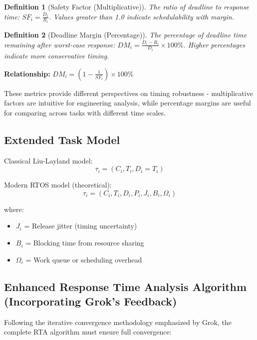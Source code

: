 \documentclass[12pt,a4paper]{article}
\newtheorem{definition}{Definition}
\begin{document}
\begin{definition}[Safety Factor (Multiplicative)]
The ratio of deadline to response time: $SF_i = \frac{D_i}{R_i}$. Values greater than 1.0 indicate schedulability with margin.
\end{definition}

\begin{definition}[Deadline Margin (Percentage)]
The percentage of deadline time remaining after worst-case response: $DM_i = \frac{D_i - R_i}{D_i} \times 100\%$. Higher percentages indicate more conservative timing.
\end{definition}

\textbf{Relationship:} $DM_i = (1 - \frac{1}{SF_i}) \times 100\%$

These metrics provide different perspectives on timing robustness - multiplicative factors are intuitive for engineering analysis, while percentage margins are useful for comparing across tasks with different time scales.

\subsection{Extended Task Model}

Classical Liu-Layland model:
\begin{equation}
\tau_i = (C_i, T_i, D_i = T_i)
\end{equation}

Modern RTOS model (theoretical):
\begin{equation}
\tau_i = (C_i, T_i, D_i, P_i, J_i, B_i, \Omega_i)
\end{equation}

where:
\begin{itemize}
\item $J_i$ = Release jitter (timing uncertainty)
\item $B_i$ = Blocking time from resource sharing
\item $\Omega_i$ = Work queue or scheduling overhead
\end{itemize}

\subsection{Enhanced Response Time Analysis Algorithm (Incorporating Grok's Feedback)}

Following the iterative convergence methodology emphasized by Grok, the complete RTA algorithm must ensure full convergence:
\end{document}
